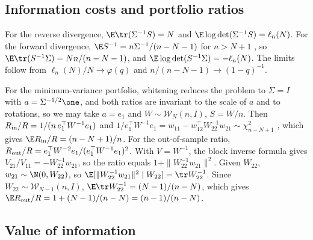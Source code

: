 \subsection*{Information costs and portfolio ratios}

For the reverse divergence, $\E\tr(\Sigma^{-1}S)=N$ and $\E\log\det(\Sigma^{-1}S)=\ell_n(N)$. For the forward divergence, $\E S^{-1}=n\Sigma^{-1}/(n-N-1)$ for $n>N+1$ \citep[Ch.~3]{muirhead1982aspects}, so $\E\tr(S^{-1}\Sigma)=Nn/(n-N-1)$, and $\E\log\det(S^{-1}\Sigma)=-\ell_n(N)$. The limits follow from $\ell_n(N)/N\to\varphi(q)$ and $n/(n-N-1)\to(1-q)^{-1}$.

For the minimum-variance portfolio, whitening reduces the problem to $\Sigma=I$ with $a=\Sigma^{-1/2}\one$, and both ratios are invariant to the scale of $a$ and to rotations, so we may take $a=e_1$ and $W\sim\mathcal W_N(n,I)$, $S=W/n$. Then $R_{\rm in}/R=1/(n\,e_1^\top W^{-1}e_1)$ and $1/e_1^\top W^{-1}e_1=w_{11}-w_{12}^\top W_{22}^{-1}w_{21}\sim\chi^2_{n-N+1}$ \citep[Ch.~3]{muirhead1982aspects}, which gives $\E R_{\rm in}/R=(n-N+1)/n$. For the out-of-sample ratio, $R_{\rm out}/R=e_1^\top W^{-2}e_1/(e_1^\top W^{-1}e_1)^2$. With $V=W^{-1}$, the block inverse formula gives $V_{21}/V_{11}=-W_{22}^{-1}w_{21}$, so the ratio equals $1+\|W_{22}^{-1}w_{21}\|^2$. Given $W_{22}$, $w_{21}\sim\N(0,W_{22})$, so $\E[\|W_{22}^{-1}w_{21}\|^2\mid W_{22}]=\tr W_{22}^{-1}$. Since $W_{22}\sim\mathcal W_{N-1}(n,I)$, $\E\tr W_{22}^{-1}=(N-1)/(n-N)$, which gives $\E R_{\rm out}/R=1+(N-1)/(n-N)=(n-1)/(n-N)$.

\subsection*{Value of information}

